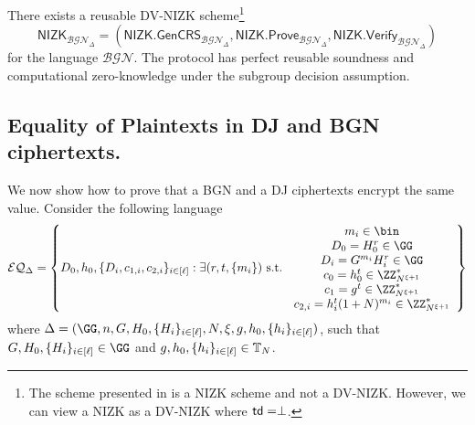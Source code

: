 \begin{lemma}
\label{lemma:GOSproof}
There exists a reusable DV-NIZK scheme\footnote{The scheme presented in \cite{EC:GroOstSah06} is a NIZK scheme and not a DV-NIZK. However, we can view a NIZK as a DV-NIZK where $\mathsf{td}=\perp$.} $$\mathsf{NIZK}_{\mathcal{BGN}_\Delta}=(\mathsf{NIZK.GenCRS}_{\mathcal{BGN}_\Delta},\mathsf{NIZK.Prove}_{\mathcal{BGN}_\Delta},\mathsf{NIZK.Verify}_{\mathcal{BGN}_\Delta})$$ for the language $\mathcal{BGN}$. The protocol has perfect reusable soundness and computational zero-knowledge under the subgroup decision assumption.
\end{lemma}

\subsection{Equality of Plaintexts in DJ and BGN ciphertexts.}


We now show how to prove that a BGN and a DJ ciphertexts encrypt the same value. Consider the following language
$$
    \mathcal{EQ}_\Delta= \left\{D_0,h_0,\{D_i,c_{1,i},c_{2,i}\}_{i\in [\ell]}: \exists (r,t,\{m_i\}) \text{ s.t. } \begin{array}{c}
m_i\in\bin\\
D_0=H_0^r\in\GG\\
     D_i=G^{m_i}H_i^r\in\GG \\
     c_0=h_0^t\in \ZZ^\ast_{N^{\xi+1}}\\
     c_{1}=g^{t}\in \ZZ^\ast_{N^{\xi+1}} \\ 
     c_{2,i}=h_i^{t}(1+N)^{m_i}\in \ZZ^\ast_{N^{\xi+1}}
\end{array} \right\}
$$
where $\Delta=(\GG,n,G,H_0,\{H_i\}_{i\in[\ell]},N,\xi,g,h_0,\{h_i\}_{i\in [\ell]})$, such that $G,H_0,\{H_i\}_{i\in[\ell]}\in\GG$ and  $g,h_0,\{h_i\}_{i\in [\ell]}\in \mathbb{T}_N$.%


